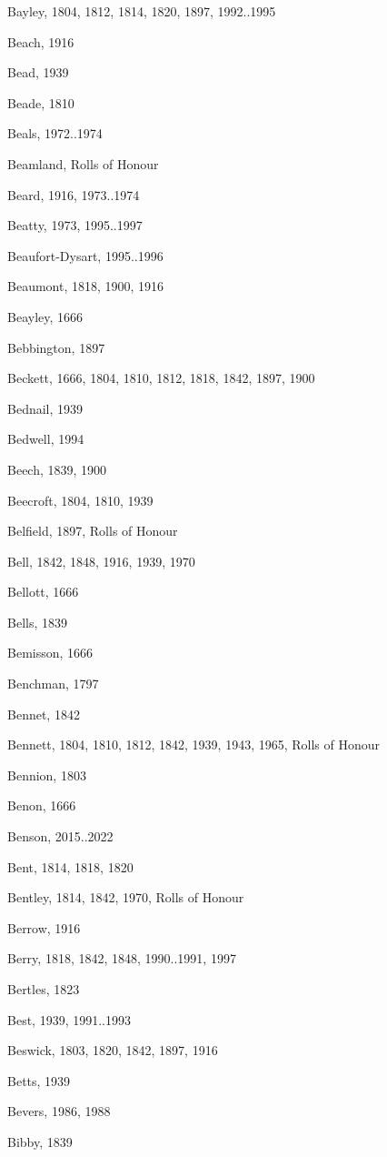 \begin{theindex}
\item Bayley, 1804, 1812, 1814, 1820, 1897, 1992..1995
\item Beach, 1916
\item Bead, 1939
\item Beade, 1810
\item Beals, 1972..1974
\item Beamland, Rolls of Honour
\item Beard, 1916, 1973..1974
\item Beatty, 1973, 1995..1997
\item Beaufort-Dysart, 1995..1996
\item Beaumont, 1818, 1900, 1916
\item Beayley, 1666
\item Bebbington, 1897
\item Beckett, 1666, 1804, 1810, 1812, 1818, 1842, 1897, 1900
\item Bednail, 1939
\item Bedwell, 1994
\item Beech, 1839, 1900
\item Beecroft, 1804, 1810, 1939
\item Belfield, 1897, Rolls of Honour
\item Bell, 1842, 1848, 1916, 1939, 1970
\item Bellott, 1666
\item Bells, 1839
\item Bemisson, 1666
\item Benchman, 1797
\item Bennet, 1842
\item Bennett, 1804, 1810, 1812, 1842, 1939, 1943, 1965, Rolls of Honour
\item Bennion, 1803
\item Benon, 1666
\item Benson, 2015..2022
\item Bent, 1814, 1818, 1820
\item Bentley, 1814, 1842, 1970, Rolls of Honour
\item Berrow, 1916
\item Berry, 1818, 1842, 1848, 1990..1991, 1997
\item Bertles, 1823
\item Best, 1939, 1991..1993
\item Beswick, 1803, 1820, 1842, 1897, 1916
\item Betts, 1939
\item Bevers, 1986, 1988
\item Bibby, 1839

\end{theindex}
